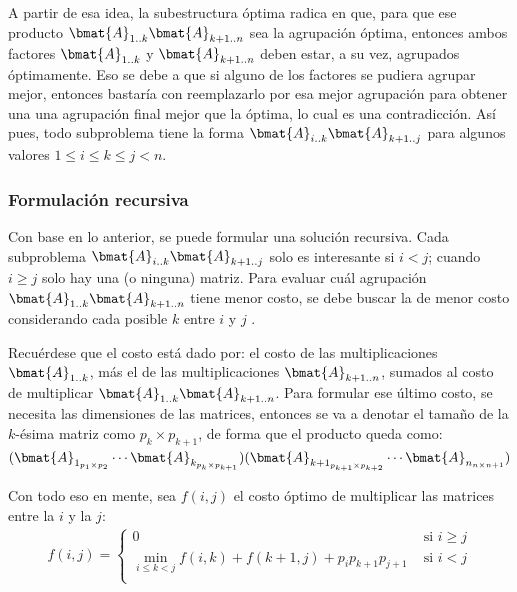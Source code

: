 A partir de esa idea, la subestructura óptima radica en que, para que ese producto \(\bmat{A}_{1..k} \bmat{A}_{k+1..n}\) sea la agrupación óptima, entonces ambos factores \(\bmat{A}_{1..k}\) y \(\bmat{A}_{k+1..n}\) deben estar, a su vez, agrupados óptimamente. Eso se debe a que si alguno de los factores se pudiera agrupar mejor, entonces bastaría con reemplazarlo por esa mejor agrupación para obtener una una agrupación final mejor que la óptima, lo cual es una contradicción. Así pues, todo subproblema tiene la forma \(\bmat{A}_{i..k} \bmat{A}_{k+1..j}\) para algunos valores \(1 \leq i\leq k\leq j < n\).

\subsubsection{Formulación recursiva}

Con base en lo anterior, se puede formular una solución recursiva. Cada subproblema \(\bmat{A}_{i..k} \bmat{A}_{k+1..j}\) solo es interesante si \(i < j\); cuando \(i \geq j\) solo hay una (o ninguna) matriz. Para evaluar cuál agrupación \(\bmat{A}_{1..k} \bmat{A}_{k+1..n}\) tiene menor costo, se debe buscar la de menor costo considerando cada posible \(k\) entre \(i\) y \(j\) .

Recuérdese que el costo está dado por: el costo de las multiplicaciones \(\bmat{A}_{1..k}\), más el de las multiplicaciones \(\bmat{A}_{k+1..n}\), sumados al costo de multiplicar \(\bmat{A}_{1..k} \bmat{A}_{k+1..n}\). Para formular ese último costo, se necesita las dimensiones de las matrices, entonces se va a denotar el tamaño de la \(k\)-ésima matriz como \(p_k \times p_{k+1}\), de forma que el producto queda como: \((\bmat{A}_{1_{p_1 \times p_2}} \cdots \bmat{A}_{k_{p_k \times p_{k+1}}})(\bmat{A}_{{k+1}_{p_{k+1} \times p_{k+2}}}\cdots \bmat{A}_{n_{n\times n+1}})\)

Con todo eso en mente, sea \(f(i,j)\) el costo óptimo de multiplicar las matrices entre la \(i\) y la \(j\):
\begin{gather*}
f(i,j) = \begin{cases}
  0 & \text{ si } i \geq j \\ 
  \min\limits_{i \leq k < j} f(i, k) + f(k+1, j) + p_ip_{k+1}p_{j+1} & \text{ si } i < j \\ 
\end{cases}
\end{gather*}